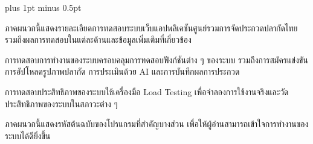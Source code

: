 
\clearpage
\thispagestyle{plain}

\begingroup
\fontsize{16pt}{19.2pt}\selectfont
\justifying
\XeTeXlinebreakskip=0pt plus 1pt minus 0.5pt
\setlength{\parindent}{1.5cm}
\setlength{\parskip}{0pt}

\par
{}\par

\indent ภาคผนวกนี้แสดงรายละเอียดการทดสอบระบบเว็บแอปพลิเคชันศูนย์รวมการจัดประกวดปลากัดไทย
รวมถึงผลการทดสอบในแต่ละด้านและข้อมูลเพิ่มเติมที่เกี่ยวข้อง

\par

\indent การทดสอบการทำงานของระบบครอบคลุมการทดสอบฟังก์ชันต่าง ๆ ของระบบ
รวมถึงการสมัครแข่งขัน การอัปโหลดรูปภาพปลากัด การประเมินด้วย AI
และการบันทึกผลการประกวด

\par

\indent การทดสอบประสิทธิภาพของระบบใช้เครื่องมือ Load Testing
เพื่อจำลองการใช้งานจริงและวัดประสิทธิภาพของระบบในสภาวะต่าง ๆ

\par
{}\par

\indent ภาคผนวกนี้แสดงรหัสต้นฉบับของโปรแกรมที่สำคัญบางส่วน
เพื่อให้ผู้อ่านสามารถเข้าใจการทำงานของระบบได้ดียิ่งขึ้น

\par\endgroup
\clearpage

